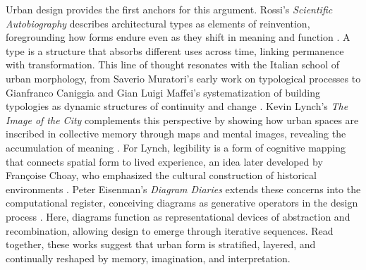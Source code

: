 \documentclass[land,article,accept,pdftex,oneauthor]{Definitions/mdpi}
\begin{document}
Urban design provides the first anchors for this argument. Rossi’s \textit{Scientific Autobiography} describes architectural types as elements of reinvention, foregrounding how forms endure even as they shift in meaning and function \cite{rossi_scientific_1981}. A type is a structure that absorbs different uses across time, linking permanence with transformation. This line of thought resonates with the Italian school of urban morphology, from Saverio Muratori’s early work on typological processes \cite{muratori_studi_1963} to Gianfranco Caniggia and Gian Luigi Maffei’s systematization of building typologies as dynamic structures of continuity and change \cite{caniggia_composizione_1979}. Kevin Lynch’s \textit{The Image of the City} complements this perspective by showing how urban spaces are inscribed in collective memory through maps and mental images, revealing the accumulation of meaning \cite{lynch_image_1960}. For Lynch, legibility is a form of cognitive mapping that connects spatial form to lived experience, an idea later developed by Françoise Choay, who emphasized the cultural construction of historical environments \cite{choay_lallegorie_1992}. Peter Eisenman’s \textit{Diagram Diaries} extends these concerns into the computational register, conceiving diagrams as generative operators in the design process \cite{eisenman_peter_1999}. Here, diagrams function as representational devices of abstraction and recombination, allowing design to emerge through iterative sequences. Read together, these works suggest that urban form is stratified, layered, and continually reshaped by memory, imagination, and interpretation.
\end{document}
